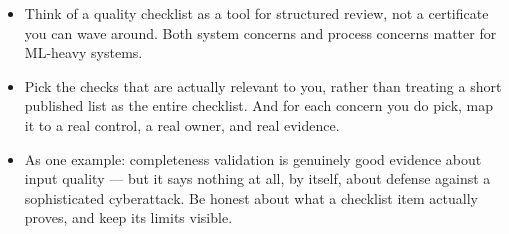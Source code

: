\documentclass[11pt,a4paper]{article}
\begin{document}
\begin{examplebox}[title after break={SPOKEN SCRIPT --- slide 45 continued}]
\begin{itemize}
\item Think of a quality checklist as a tool for structured review, not a certificate you can wave around. Both system concerns and process concerns matter for ML-heavy systems.
\item Pick the checks that are actually relevant to you, rather than treating a short published list as the entire checklist. And for each concern you do pick, map it to a real control, a real owner, and real evidence.
\item As one example: completeness validation is genuinely good evidence about input quality — but it says nothing at all, by itself, about defense against a sophisticated cyberattack. Be honest about what a checklist item actually proves, and keep its limits visible.
\end{itemize}
\end{examplebox}
\par\noindent{\scriptsize\textcolor{teal!60!black}{Reading anchor: Bucaioni, published Table 1, pp. 6–7 · Bass, Ch. 14 · Corrigendum contents not reviewed}}
\clearpage
\end{document}
